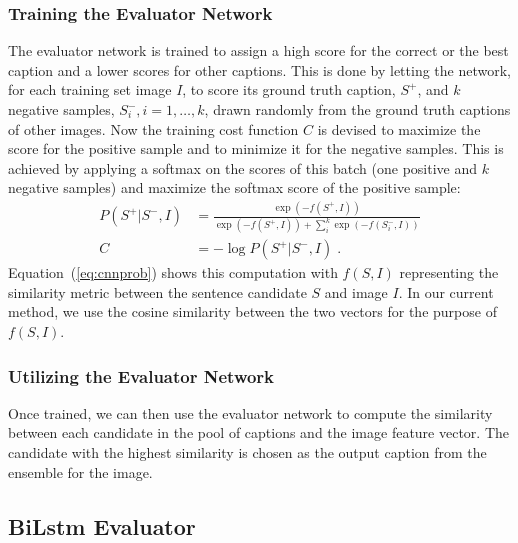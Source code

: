 
\subsubsection{Training the Evaluator Network}

The evaluator network is trained to assign a high score for the
correct or the best caption and a lower scores for other captions.
This is done by letting the network, for each training set image $I$,
to score its ground truth caption, $S^+$, and $k$ negative samples,
$S_i^-, i=1,\ldots,k$, drawn randomly from the ground truth captions
of other images.
Now the training cost function $C$ is devised to maximize the score for
the positive sample and to minimize it for the negative samples. 
This is achieved by applying a softmax on the scores of this batch
(one positive and $k$ negative samples) and maximize the softmax score
of the positive sample:
\begin{align}
  \label{eq:cnnprob} 
  P(S^+|S^-,I) &= \frac{\exp(-f(S^+,I))}{\exp(-f(S^+,I)) +
           \sum\limits_i^k{\exp(-f(S_i^- ,I))}} \\
  C &= -\log P(S^+|S^-,I) \;.
\end{align}
Equation~(\ref{eq:cnnprob}) shows this computation with $f(S,I)$
representing the similarity metric between the sentence candidate $S$
and image $I$.
In our current method, we use the cosine similarity between the two
vectors for the purpose of $f(S,I)$.


\subsubsection{Utilizing the Evaluator Network}

Once trained, we can then use the evaluator network to compute the
similarity between each candidate in the pool of captions and the
image feature vector. 
The candidate with the highest similarity is chosen as the output
caption from the ensemble for the image.

\subsection{BiLstm Evaluator}
